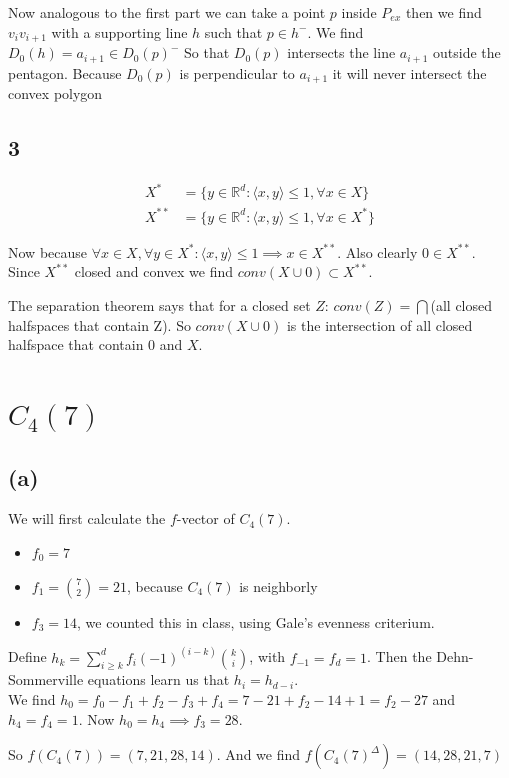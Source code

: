 \documentclass[paper=a4, fontsize=11pt]{scrartcl} %
\theoremstyle{plain}
\begin{document}
Now analogous to the first part we can take a point $p$ inside $P_{ex}$ then we find $v_{i}v_{i+1}$ with a supporting line $h$ such that $p\in h^-$. We find $D_0(h)=a_{i+1}\in D_0(p)^-$ So that $D_0(p)$ intersects the line $a_{i+1}$ outside the pentagon. Because $D_0(p)$ is perpendicular to $a_{i+1}$ it will never intersect the convex polygon

\subsection{3}
\begin{align*}
X^{*} &= \{y\in \mathbb{R}^{d} : \langle x,y\rangle \leq 1, \forall x \in X\}\\
X^{**} &= \{y\in \mathbb{R}^{d} : \langle x,y\rangle \leq 1, \forall x \in X^{*}\}
\end{align*}
 
Now because $\forall x\in X,\forall y \in X^{*} : \langle x,y\rangle \leq 1 \implies x\in X^{**}$. Also clearly $0\in X^{**}$. Since $X^{**}$ closed and convex we find $conv(X\cup 0)\subset X^{**}$.

The separation theorem says that for a closed set $Z$: $conv(Z)=\bigcap$(all closed halfspaces that contain Z).
So $conv(X\cup 0)$ is the intersection of all closed halfspace that contain $0$ and $X$.

\section{$C_4(7)$}
\subsection{(a)}
We will first calculate the $f$-vector of $C_4(7)$.
\begin{itemize}
\item $f_0=7$
\item $f_1= \binom{7}{2} = 21$, because $C_4(7)$ is neighborly
\item $f_3 = 14$, we counted this in class, using Gale's evenness criterium.
\end{itemize}

Define $h_k = \sum_{i\geq k}^{d} f_{i}(-1)^{(i-k)}\binom{k}{i} $, with $f_{-1}=f_{d}=1$. Then the Dehn-Sommerville equations learn us that $h_i=h_{d-i}$.\\
We find $h_0=f_0-f_1+f_2-f_3+f_4=7-21+f_2-14+1=f_2-27$ and $h_4=f_4=1$. Now $h_0=h_4\implies f_3=28$.

So $f(C_4(7))=(7,21,28,14)$. And we find $f(C_4(7)^\Delta)=(14,28,21,7)$
\end{document}
